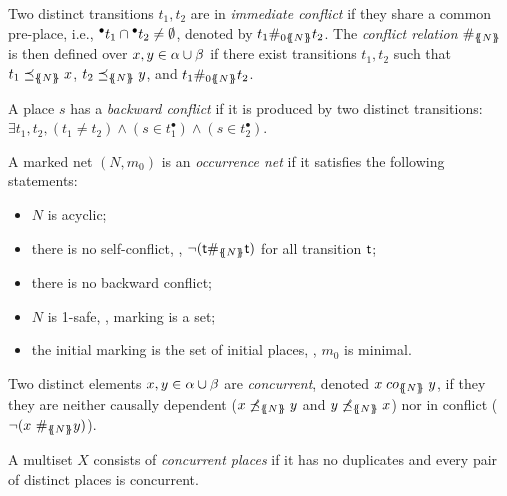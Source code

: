 \begin{definition}[Conflict]
  \label{def:conflict}
Two distinct transitions $t_1, t_2$ are in \emph{immediate conflict} if they share a common pre-place, i.e., ${}^\bullet{t_1} \cap {}^\bullet{t_2} \neq \emptyset$, denoted by $t_1 \#_{0\{\!\!\{ N \}\!\!\}} t_2$. The \emph{conflict relation} $\#_{\{\!\!\{ N \}\!\!\}}$ is then defined over $x, y \in \alpha \cup \beta$ if there exist transitions $t_1, t_2$ such that $t_1 \preceq_{\{\!\!\{ N \}\!\!\}} x$, $t_2 \preceq_{\{\!\!\{ N \}\!\!\}} y$, and $t_1 \#_{0\{\!\!\{ N \}\!\!\}} t_2$.
\end{definition}

\begin{definition}\label{def:bwd-conflict}
A place $s$ has a \emph{backward conflict} if it is produced by two distinct transitions: $\exists t_1, t_2, (t_1 \neq t_2) \wedge (s \in t_1^\bullet ) \wedge  (s\in t_2^\bullet)$.
\end{definition}

\begin{definition}\label{def:occ-net}
A marked net $(N,m_0)$ is an \textit{occurrence net} if it satisfies the
following statements:
\begin{itemize}
  \item $N$ is acyclic;
  \item there is no self-conflict, \ie, $\neg({\sf t}\#_{\{\!\!\{ N \}\!\!\}}{\sf t})$
    for all transition ${\sf t}$;
  \item there is no backward conflict;
  \item $N$ is 1-safe, \ie, marking is a set;
  \item the initial marking is the set of initial places, \ie, $m_0$ is minimal.
  \end{itemize}
\end{definition}

\begin{definition}[Concurrent]\label{def:concurrent}
  Two distinct elements $x, y \in \alpha \cup \beta$ are
\emph{concurrent}, denoted  $x \mathrel{co}_{\{\!\!\{ N \}\!\!\}}y$, if they
they are neither causally dependent ($x \not\preceq_{\{\!\!\{ N\}\!\!\}}y$ and
$y \not\preceq_{\{\!\!\{ N\}\!\!\}}x$) nor in conflict
($\neg(x \ \#_{\{\!\!\{ N\}\!\!\}}y)$).

A multiset $X$ consists of \emph{concurrent places} if it has no duplicates
 and every pair of distinct places is
 concurrent.
\end{definition}

